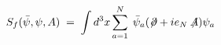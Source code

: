 \begin{equation}\label{eq:defsf}
S_f({\bar\psi},\psi,A)\;=\; \int d^3x \sum_{a=1}^N \; {\bar\psi}_a
( \not\!\partial + i e_N \not\!\! A ) \psi_a 
\end{equation}


